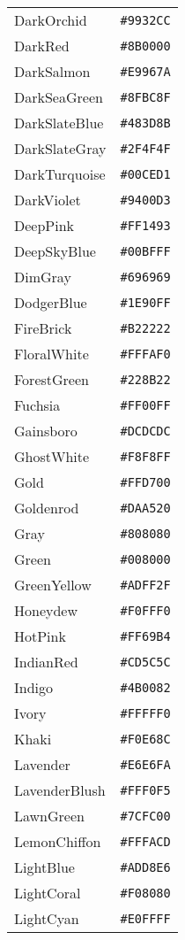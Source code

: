 \documentclass[a4paper]{article}
\begin{document}
\begin{longtable}{|l|r|}
DarkOrchid & \texttt{\#9932CC} \\
DarkRed & \texttt{\#8B0000} \\
DarkSalmon & \texttt{\#E9967A} \\
DarkSeaGreen & \texttt{\#8FBC8F} \\
DarkSlateBlue & \texttt{\#483D8B} \\
DarkSlateGray & \texttt{\#2F4F4F} \\
DarkTurquoise & \texttt{\#00CED1} \\
DarkViolet & \texttt{\#9400D3} \\
DeepPink & \texttt{\#FF1493} \\
DeepSkyBlue & \texttt{\#00BFFF} \\
DimGray & \texttt{\#696969} \\
DodgerBlue & \texttt{\#1E90FF} \\
FireBrick & \texttt{\#B22222} \\
FloralWhite & \texttt{\#FFFAF0} \\
ForestGreen & \texttt{\#228B22} \\
Fuchsia & \texttt{\#FF00FF} \\
Gainsboro & \texttt{\#DCDCDC} \\
GhostWhite & \texttt{\#F8F8FF} \\
Gold & \texttt{\#FFD700} \\
Goldenrod & \texttt{\#DAA520} \\
Gray & \texttt{\#808080} \\
Green & \texttt{\#008000} \\
GreenYellow & \texttt{\#ADFF2F} \\
Honeydew & \texttt{\#F0FFF0} \\
HotPink & \texttt{\#FF69B4} \\
IndianRed & \texttt{\#CD5C5C} \\
Indigo & \texttt{\#4B0082} \\
Ivory & \texttt{\#FFFFF0} \\
Khaki & \texttt{\#F0E68C} \\
Lavender & \texttt{\#E6E6FA} \\
LavenderBlush & \texttt{\#FFF0F5} \\
LawnGreen & \texttt{\#7CFC00} \\
LemonChiffon & \texttt{\#FFFACD} \\
LightBlue & \texttt{\#ADD8E6} \\
LightCoral & \texttt{\#F08080} \\
LightCyan & \texttt{\#E0FFFF} \\

\end{longtable}
\end{document}
